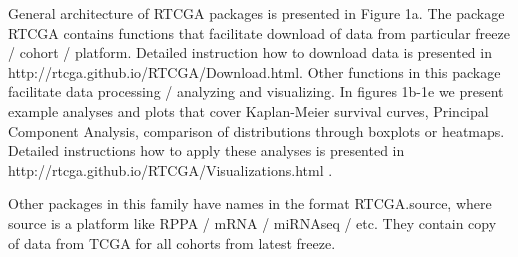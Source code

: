 \documentclass{bioinfo}
\begin{document}
General architecture of RTCGA packages is presented in Figure 1a. The package RTCGA contains functions that facilitate download of data from particular freeze / cohort / platform. Detailed instruction how to download data is presented in http://rtcga.github.io/RTCGA/Download.html. Other functions in this package facilitate data processing / analyzing and visualizing. In figures 1b-1e we present example analyses and plots that cover Kaplan-Meier survival curves, Principal Component Analysis, comparison of distributions through boxplots or heatmaps. Detailed instructions how to apply these analyses is presented in http://rtcga.github.io/RTCGA/Visualizations.html .

Other packages in this family have names in the format RTCGA.source, where source is a platform like RPPA / mRNA / miRNAseq / etc. They contain copy of data from TCGA for all cohorts from latest freeze.   
\end{document}
